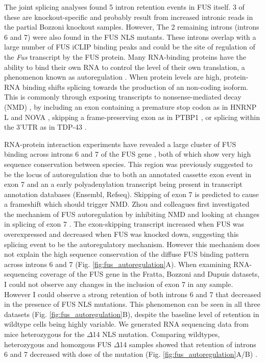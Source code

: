 The joint splicing analyses found 5 intron retention events in FUS itself.
3 of these are knockout-specific and probably result from increased intronic reads in the partial Bozzoni knockout samples. 
However, The 2 remaining introns (introns 6 and 7) were also found in the FUS NLS mutants.
These introns overlap with a large number of FUS iCLIP binding peaks and could be the site of regulation of the \textit{Fus} transcript by the FUS protein.
Many RNA-binding proteins have the ability to bind their own RNA to control the level of their own translation, a phenomenon known as autoregulation \citep{Rosenfeld2002,Jangi2014a}.
When protein levels are high, protein-RNA binding shifts splicing towards the production of an non-coding isoform.
This is commonly through exposing transcripts to nonsense-mediated decay (NMD) \citep{McGlincy2008-wh}, by including an exon containing a premature stop codon as in HNRNP L and NOVA \citep{Rossbach2009,Dredge2005}, skipping a frame-preserving exon as in PTBP1 \citep{Wollerton2004}, or splicing within the 3'UTR as in TDP-43 \citep{Ayala2011}. 

RNA-protein interaction experiments have revealed a large cluster of FUS binding across introns 6 and 7 of the FUS gene \citep{Lagier-Tourenne2012}, both of which show very high sequence conservation between species.
This region was previously suggested to be the locus of autoregulation due to both an annotated cassette exon event in exon 7 and an a early polyadenylation transcript being present in transcript annotation databases (Ensembl, Refseq).
Skipping of exon 7 is predicted to cause a frameshift which should trigger NMD. 
Zhou and colleagues first investigated the mechanism of FUS autoregulation by inhibiting NMD and looking at changes in splicing of exon 7 \citep{Zhou2013}.
The exon-skipping transcript increased when FUS was overexpressed and decreased when FUS was knocked down, suggesting this splicing event to be the autoregulatory mechanism.
However this mechanism does not explain the high sequence conservation of the diffuse FUS binding pattern across introns 6 and 7 (Fig. \ref{fig:fus_autoregulation}A).
When examining RNA-sequencing coverage of the FUS gene in the Fratta, Bozzoni and Dupuis datasets, I could not observe any changes in the inclusion of exon 7 in any sample.
However I could observe a strong retention of both introns 6 and 7 that decreased in the presence of FUS NLS mutations. 
This phenomenon can be seen in all three datasets (Fig. \ref{fig:fus_autoregulation}B), despite the baseline level of retention in wildtype cells being highly variable. 
We generated RNA sequencing data from mice heterozygous for the $\Delta$14 NLS mutation. 
Comparing wildtypes, heterozygous and homozgous FUS $\Delta$14 samples showed that retention of introns 6 and 7 decreased with dose of the mutation (Fig. \ref{fig:fus_autoregulation}A/B) .

